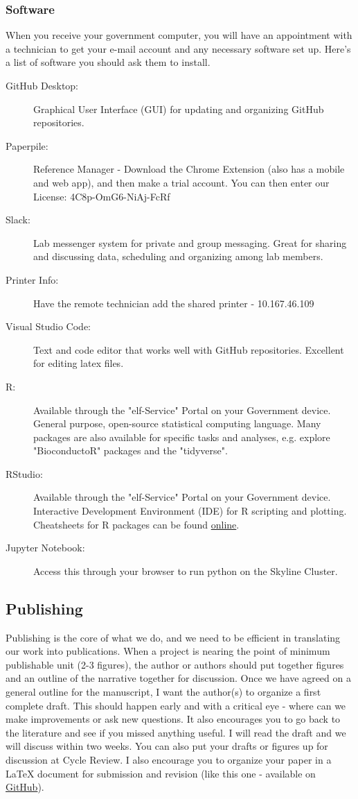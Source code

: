 \documentclass[10pt, letterpaper, twocolumn]{article} %
\begin{document}
\subsubsection{Software}
When you receive your government computer, you will have an appointment with a technician to get your e-mail account and any necessary software set up. Here's a list of software you should ask them to install.
\begin{description}
\item [GitHub Desktop:] Graphical User Interface (GUI) for updating and organizing GitHub repositories.
\item [Paperpile:] Reference Manager - Download the Chrome Extension (also has a mobile and web app), and then make a trial account. You can then enter our License: 4C8p-OmG6-NiAj-FcRf
\item [Slack:] Lab messenger system for private and group messaging. Great for sharing and discussing data, scheduling and organizing among lab members.
\item [Printer Info:] Have the remote technician add the shared printer - 10.167.46.109
\item [Visual Studio Code:] Text and code editor that works well with GitHub repositories. Excellent for editing latex files.
\item [R:] Available through the "elf-Service" Portal on your Government device. General purpose, open-source statistical computing language. Many packages are also available for specific tasks and analyses, e.g. explore "BioconductoR" packages and the "tidyverse".
\item [RStudio:]Available through the "elf-Service" Portal on your Government device. Interactive Development Environment (IDE) for R scripting and plotting. Cheatsheets for R packages can be found \href{https://www.rstudio.com/resources/cheatsheets/}{online}.
\item [Jupyter Notebook:] Access this through your browser to run python on the Skyline Cluster.
\end{description}

\subsection{Publishing}
Publishing is the core of what we do, and we need to be efficient in translating our work into publications. When a project is nearing the point of minimum publishable unit (2-3 figures), the author or authors should put together figures and an outline of the narrative together for discussion. Once we have agreed on a general outline for the manuscript, I want the author(s) to organize a first complete draft. This should happen early and with a critical eye - where can we make improvements or ask new questions. It also encourages you to go back to the literature and see if you missed anything useful. I will read the draft and we will discuss within two weeks. You can also put your drafts or figures up for discussion at Cycle Review. I also encourage you to organize your paper in a LaTeX document for submission and revision (like this one - available on \href{https://github.com/QVEU/QVEU/blob/main/ExpectationsDocument/main.tex}{GitHub}).
\end{document}
